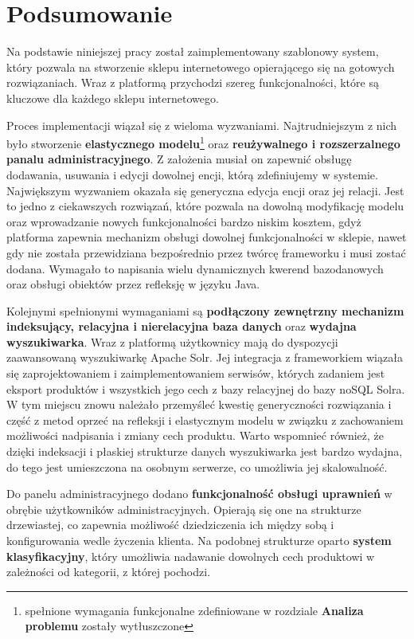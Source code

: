 \chapter{Podsumowanie}
\thispagestyle{chapterBeginStyle}

Na podstawie niniejszej pracy został zaimplementowany szablonowy system, który pozwala na stworzenie sklepu internetowego opierającego się na gotowych rozwiązaniach. Wraz z platformą przychodzi szereg funkcjonalności, które są kluczowe dla każdego sklepu internetowego. 

Proces implementacji wiązał się z wieloma wyzwaniami. Najtrudniejszym z nich było stworzenie \textbf{elastycznego modelu}\footnote{spełnione wymagania funkcjonalne zdefiniowane w rozdziale \textbf{Analiza problemu} zostały wytłuszczone} oraz \textbf{reużywalnego i rozszerzalnego panalu administracyjnego}. Z założenia musiał on zapewnić obsługę dodawania, usuwania i edycji dowolnej encji, którą zdefiniujemy w systemie. Największym wyzwaniem okazała się generyczna edycja encji oraz jej relacji. Jest to jedno z ciekawszych rozwiązań, które pozwala na dowolną modyfikację modelu oraz wprowadzanie nowych funkcjonalności bardzo niskim kosztem, gdyż platforma zapewnia mechanizm obsługi dowolnej funkcjonalności w sklepie, nawet gdy nie została przewidziana bezpośrednio przez twórcę frameworku i musi zostać dodana. Wymagało to napisania wielu dynamicznych kwerend bazodanowych oraz obsługi obiektów przez refleksję w języku Java.

Kolejnymi spełnionymi wymaganiami są \textbf{podłączony zewnętrzny mechanizm indeksujący, relacyjna i nierelacyjna baza danych} oraz \textbf{wydajna wyszukiwarka}. Wraz z platformą użytkownicy mają do dyspozycji zaawansowaną wyszukiwarkę Apache Solr. Jej integracja z frameworkiem wiązała się zaprojektowaniem i zaimplementowaniem serwisów, których zadaniem jest eksport produktów i wszystkich jego cech z bazy relacyjnej do bazy noSQL Solra. W tym miejscu znowu należało przemyśleć kwestię generyczności rozwiązania i część z metod oprzeć na refleksji i elastycznym modelu w związku z zachowaniem możliwości nadpisania i zmiany cech produktu. Warto wspomnieć również, że dzięki indeksacji i płaskiej strukturze danych wyszukiwarka jest bardzo wydajna, do tego jest umieszczona na osobnym serwerze, co umożliwia jej skalowalność. 

Do panelu administracyjnego dodano \textbf{funkcjonalność obsługi uprawnień} w obrębie użytkowników administracyjnych. Opierają się one na strukturze drzewiastej, co zapewnia możliwość dziedziczenia ich między sobą i konfigurowania wedle życzenia klienta. Na podobnej strukturze oparto \textbf{system klasyfikacyjny}, który umożliwia nadawanie dowolnych cech produktowi w zależności od kategorii, z której pochodzi.

